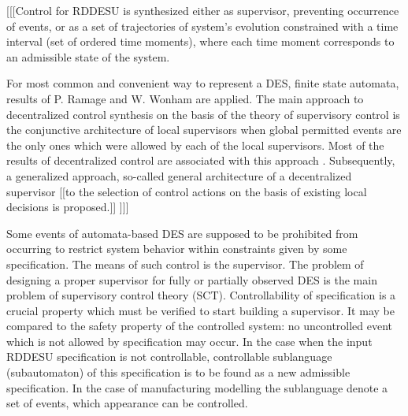 \documentclass[runningheads]{llncs}
\begin{document}

[[[Control for RDDESU is synthesized either as supervisor, preventing occurrence of events, or as a set of trajectories of system’s evolution constrained with a time interval (set of ordered time moments), where each time moment corresponds to an admissible state of the system.

For most common and convenient way to represent a DES, finite state automata, results of P. Ramage and W. Wonham \cite{whoam} are applied. The main approach to decentralized control synthesis on the basis of the theory of supervisory control is the conjunctive architecture of local supervisors when global permitted events are the only ones which were allowed by each of the local supervisors. Most of the results of decentralized control are associated with this approach \cite{whoam}. Subsequently, a generalized approach, so-called general architecture of a decentralized supervisor \cite{tsyoo} [[to the selection of control actions on the basis of existing local decisions is proposed.]] ]]]

Some events of automata-based DES are supposed to be prohibited from occurring to restrict system behavior within constraints given by some specification. The means of such control is the supervisor. The problem of designing a proper supervisor for fully or partially observed DES is the main problem of supervisory control theory (SCT). Controllability of specification is a crucial property which must be verified to start building a supervisor. It may be compared to the safety property of the controlled system: no uncontrolled event which is not allowed by specification may occur. In the case when the input RDDESU specification is not controllable, controllable sublanguage (subautomaton) of this specification is to be found as a new admissible specification. In the case of manufacturing modelling the sublanguage denote a set of events, which appearance can be controlled. %
\end{document}
